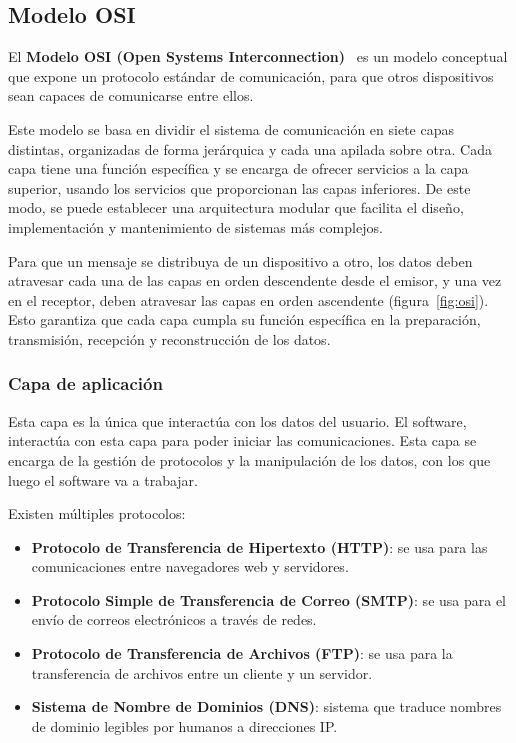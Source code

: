 \subsection{Modelo OSI}
\label{subsec:OSI}
El \textbf{Modelo OSI (Open Systems Interconnection)}~\cite{modelo_osi} es un modelo conceptual que expone un protocolo estándar de comunicación, para que otros dispositivos sean capaces de comunicarse entre ellos. 

Este modelo se basa en dividir el sistema de comunicación en siete capas distintas, organizadas de forma jerárquica y cada una apilada sobre otra. Cada capa tiene una función específica y se encarga de ofrecer servicios a la capa superior, usando los servicios que proporcionan las capas inferiores. De este modo, se puede establecer una arquitectura modular que facilita el diseño, implementación y mantenimiento de sistemas más complejos.


Para que un mensaje se distribuya de un dispositivo a otro, los datos deben atravesar cada una de las capas en orden descendente desde el emisor, y una vez en el receptor, deben atravesar las capas en orden ascendente (figura~\ref{fig:osi}). Esto garantiza que cada capa cumpla su función específica en la preparación, transmisión, recepción y reconstrucción de los datos.

\subsubsection{Capa de aplicación}
\label{subsubsec:CapaAplicacion}
Esta capa es la única que interactúa con los datos del usuario. El software, interactúa con esta capa para poder iniciar las comunicaciones. Esta capa se encarga de la gestión de protocolos y la manipulación de los datos, con los que luego el software va a trabajar.

Existen múltiples protocolos:
\begin{itemize}
    \item \textbf{Protocolo de Transferencia de Hipertexto (HTTP)}: se usa para las comunicaciones entre navegadores web y servidores.
    \item \textbf{Protocolo Simple de Transferencia de Correo (SMTP)}: se usa para el envío de correos electrónicos a través de redes.
    \item \textbf{Protocolo de Transferencia de Archivos (FTP)}: se usa para la transferencia de archivos entre un cliente y un servidor.
    \item \textbf{Sistema de Nombre de Dominios (DNS)}: sistema que traduce nombres de dominio legibles por humanos a direcciones IP.
\end{itemize}

